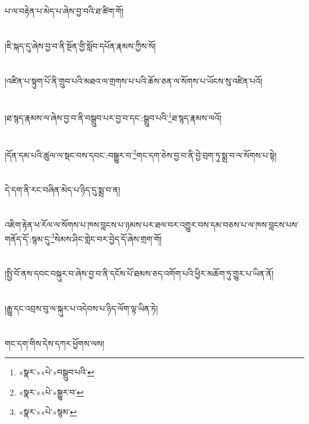 པ་ལ་བརྟེན་པ་མེད་པ་ཞེས་བྱ་བའི་ཐ་ཚིག་གོ།\chapter{ }།ཇི་སྐད་དུ་ཞེས་བྱ་བ་ནི་སྔོན་གྱི་སློབ་དཔོན་རྣམས་ཀྱིས་སོ།\chapter{ }།འཛིན་པ་སྟུག་པོ་ནི་གྲུབ་པའི་མཐའ་ལ་གྲགས་པ་པའི་ཆོས་ཅན་ལ་སོགས་པ་ཡོངས་སུ་འཛིན་པའོ།\chapter{ }།ཐ་སྙད་རྣམས་ལ་ཞེས་བྱ་བ་ནི་བསྒྲུབ་པར་བྱ་བ་དང་:སྒྲུབ་པའི་\footnote{«སྣར་»«པེ་»བསྒྲུབ་པའི་}ཐ་སྙད་རྣམས་ལའོ།\chapter{ }།དོན་དམ་པའི་ཚུལ་ལ་སྡང་བས་དབང་:བསྒྱུར་བ་\footnote{«སྣར་»«པེ་»སྒྱུར་བ་}གང་དག་ཅེས་བྱ་བ་ནི་བྱེ་བྲག་ཏུ་སྨྲ་བ་ལ་སོགས་པ་སྟེ།\chapter{ }དེ་དག་ནི་རང་བཞིན་མེད་པ་ཉིད་དུ་སྨྲ་བ་ན།\chapter{ }འཇིག་རྟེན་ཕ་རོལ་ལ་སོགས་པ་ཁས་བླངས་པ་ཉམས་པར་ཐལ་བར་འགྱུར་བས་དམ་བཅས་པ་ལ་ཁས་བླངས་པས་གནོད་དོ་:སྙམ་དུ་\footnote{«སྣར་»«པེ་»སྙམ་}སེམས་ཤིང་གླེང་བར་བྱེད་དོ་ཞེས་གྲག་གོ།\chapter{ }།སྤྱི་བོ་ནས་དབང་བསྐུར་བ་ཞེས་བྱ་བ་ནི་དངོས་པོ་ཐམས་ཅད་འགོག་པའི་ཕྱིར་མཆོག་ཏུ་གྱུར་པ་ཡིན་ནོ།\chapter{ }།རྒྱུ་དང་འབྲས་བུ་ལ་སྐུར་པ་འདེབས་པ་ཉིད་ལོག་ལྟ་ཡིན་ཏེ།\chapter{ }གང་དག་གིས་དེས་དཀར་ཕྱོགས་ལས།\chap